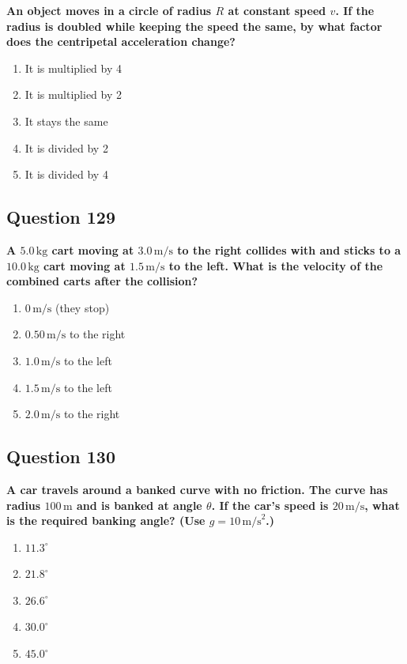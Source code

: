 \documentclass[12pt,letterpaper]{article}
\begin{document}
\begin{questionbox}
\textbf{An object moves in a circle of radius $R$ at constant speed $v$. If the radius is doubled while keeping the speed the same, by what factor does the centripetal acceleration change?}

\begin{enumerate}[label=\alph*)]
    \item It is multiplied by 4
    \item It is multiplied by 2
    \item It stays the same
    \item It is divided by 2
    \item It is divided by 4
\end{enumerate}
\end{questionbox}

\subsection{Question 129}

\begin{questionbox}
\textbf{A $5.0\,\text{kg}$ cart moving at $3.0\,\text{m/s}$ to the right collides with and sticks to a $10.0\,\text{kg}$ cart moving at $1.5\,\text{m/s}$ to the left. What is the velocity of the combined carts after the collision?}

\begin{enumerate}[label=\alph*)]
    \item $0\,\text{m/s}$ (they stop)
    \item $0.50\,\text{m/s}$ to the right
    \item $1.0\,\text{m/s}$ to the left
    \item $1.5\,\text{m/s}$ to the left
    \item $2.0\,\text{m/s}$ to the right
\end{enumerate}
\end{questionbox}

\subsection{Question 130}

\begin{questionbox}
\textbf{A car travels around a banked curve with no friction. The curve has radius $100\,\text{m}$ and is banked at angle $\theta$. If the car's speed is $20\,\text{m/s}$, what is the required banking angle? (Use $g = 10\,\text{m/s}^2$.)}

\begin{enumerate}[label=\alph*)]
    \item $11.3^\circ$
    \item $21.8^\circ$
    \item $26.6^\circ$
    \item $30.0^\circ$
    \item $45.0^\circ$
\end{enumerate}
\end{questionbox}
\end{document}
